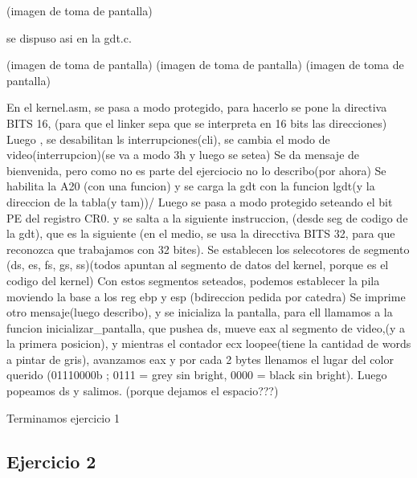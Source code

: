 \documentclass[a4paper]{article}
\begin{document}
(imagen de toma de pantalla)

se dispuso asi en la gdt.c.


(imagen de toma de pantalla)
(imagen de toma de pantalla)
(imagen de toma de pantalla)

En el kernel.asm, se pasa a modo protegido, para hacerlo se pone la directiva BITS 16, (para que el linker sepa que se interpreta en 16 bits las direcciones)
Luego , se desabilitan ls interrupciones(cli), se cambia el modo de video(interrupcion)(se va a modo 3h y luego   se setea) 
Se da mensaje de bienvenida, pero como no es parte del ejerciocio no lo describo(por ahora)
Se habilita la A20 (con una funcion) y se carga la gdt con la funcion lgdt(y la direccion de la tabla(y tam))/
Luego se pasa a modo protegido seteando el bit PE del registro CR0. y se salta a la siguiente instruccion, (desde seg de codigo de la gdt), que es la siguiente (en el medio, se usa la direcctiva BITS 32, para que reconozca que trabajamos con 32 bites). Se establecen los selecotores de segmento (ds, es, fs, gs, ss)(todos apuntan al segmento de datos del kernel, porque es el codigo del kernel)
Con estos segmentos seteados, podemos establecer la pila moviendo la base a los reg ebp y esp (bdireccion pedida por catedra)
Se imprime otro mensaje(luego describo), y se inicializa la pantalla, para ell llamamos a la funcion inicializar_pantalla, que pushea ds, mueve eax al segmento de video,(y a la primera posicion), y mientras el contador ecx loopee(tiene la cantidad de words a pintar de gris), avanzamos eax y por cada 2 bytes llenamos el lugar del color querido (01110000b ; 0111 = grey sin bright, 0000 = black sin bright). Luego popeamos ds y salimos. (porque dejamos el espacio???)
   
Terminamos ejercicio 1

\newpage

\subsection{Ejercicio 2}
\end{document}
